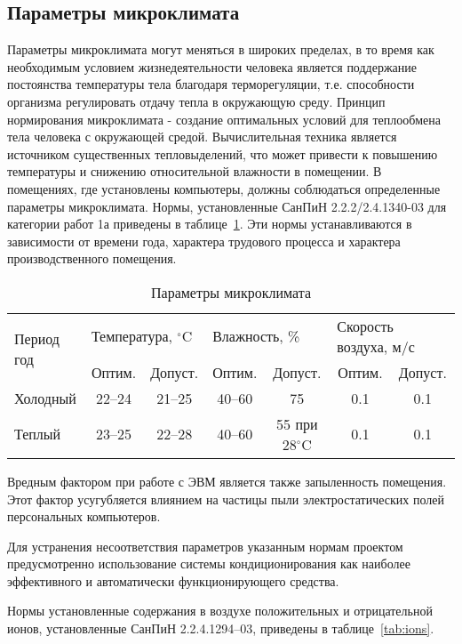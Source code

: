 \subsection{Параметры микроклимата}

Параметры микроклимата могут меняться в широких пределах, в то время как необходимым условием жизнедеятельности человека является поддержание постоянства температуры тела благодаря терморегуляции, т.е. способности организма регулировать отдачу тепла в окружающую среду. Принцип нормирования микроклимата - создание оптимальных условий для теплообмена
тела человека с окружающей  средой. Вычислительная техника является источником существенных тепловыделений, что может привести к повышению температуры и снижению относительной влажности в помещении. В помещениях, где установлены компьютеры, должны соблюдаться определенные параметры микроклимата. Нормы, установленные СанПиН 2.2.2/2.4.1340-03 для категории работ 1а приведены в таблице~\ref{tab:microclimate}. Эти нормы устанавливаются в зависимости от времени года, характера трудового процесса и характера производственного помещения.

\begin{table}[ht]
\caption{Параметры микроклимата}
\begin{tabular}{|l|c|c|c|c|c|c|}
\hline
\multirow{2}{*}{Период год} & \multicolumn{2}{l|}{Температура, $^\circ \mbox{C}$} & \multicolumn{2}{l|}{Влажность, \%} & \multicolumn{2}{l|}{Скорость воздуха, м/с} \\
\cline{2-7}
&Оптим.&Допуст.&Оптим.&Допуст.&Оптим.&Допуст.\\
\hline
Холодный &22--24&21--25&40--60&75&0.1&0.1\\
\hline
Теплый &23--25&22--28&40--60&55 при 28$^\circ \mbox{C}$&0.1&0.1\\
\hline 
\end{tabular}
\label{tab:microclimate}
\end{table}

Вредным фактором при работе с ЭВМ является также запыленность помещения. Этот фактор усугубляется влиянием на частицы пыли электростатических полей персональных компьютеров.

Для устранения несоответствия параметров указанным нормам проектом предусмотренно использование системы кондиционирования как наиболее эффективного и автоматически функционирующего средства.

Нормы установленные содержания в воздухе положительных и отрицательной ионов, установленные СанПиН 2.2.4.1294--03, приведены в таблице~\ref{tab:ions}.

